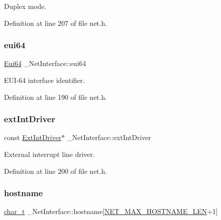 Duplex mode. 



Definition at line 207 of file net.\+h.

\mbox{\label{struct__NetInterface_a36a2f0e5c4a22325ad85efc69a6fbfa6}} 
\subsubsection{\texorpdfstring{eui64}{eui64}}
{\footnotesize\ttfamily \hyperlink{ethernet_8h_acbcae3afd042b3ce97e42f54013c8137}{Eui64} \+\_\+\+Net\+Interface\+::eui64}



E\+U\+I-\/64 interface identifier. 



Definition at line 190 of file net.\+h.

\mbox{\label{struct__NetInterface_a8b71f7fc40c4944a1b9f3b0cc9a51ad9}} 
\subsubsection{\texorpdfstring{ext\+Int\+Driver}{extIntDriver}}
{\footnotesize\ttfamily const \hyperlink{structExtIntDriver}{Ext\+Int\+Driver}$\ast$ \+\_\+\+Net\+Interface\+::ext\+Int\+Driver}



External interrupt line driver. 



Definition at line 200 of file net.\+h.

\mbox{\label{struct__NetInterface_aedfb2c021f93d86d510d000b0c230ead}} 
\subsubsection{\texorpdfstring{hostname}{hostname}}
{\footnotesize\ttfamily \hyperlink{compiler__port_8h_a40bb5262bf908c328fbcfbe5d29d0201}{char\+\_\+t} \+\_\+\+Net\+Interface\+::hostname\mbox{[}\hyperlink{net_8h_a3f9223c8ef61451fec92d5354c93b34f}{N\+E\+T\+\_\+\+M\+A\+X\+\_\+\+H\+O\+S\+T\+N\+A\+M\+E\+\_\+\+L\+EN}+1\mbox{]}}




